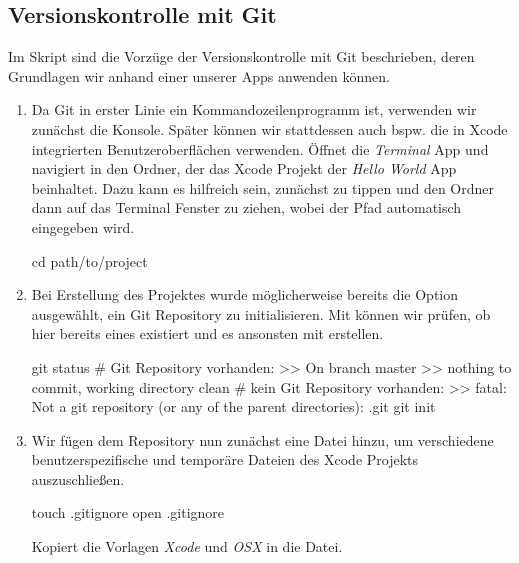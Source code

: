 \documentclass[parskip=half, final]{scrreprt}
\begin{document}
\begin{lecture} %


\chapter{Versionskontrolle mit Git}

Im Skript sind die Vorzüge der Versionskontrolle mit Git beschrieben, deren Grundlagen wir anhand einer unserer Apps anwenden können.


\begin{enumerate}

\item Da Git in erster Linie ein Kommandozeilenprogramm ist, verwenden wir zunächst die Konsole. Später können wir stattdessen auch bspw. die in Xcode integrierten Benutzeroberflächen verwenden. Öffnet die \emph{Terminal} App und navigiert in den Ordner, der das Xcode Projekt der \emph{Hello World} App beinhaltet. Dazu kann es hilfreich sein, zunächst  zu tippen und den Ordner dann auf das Terminal Fenster zu ziehen, wobei der Pfad automatisch eingegeben wird.

\begin{shlst}
cd path/to/project
\end{shlst}

\item Bei Erstellung des Projektes wurde möglicherweise bereits die Option ausgewählt, ein Git Repository zu initialisieren. Mit  können wir prüfen, ob hier bereits eines existiert und es ansonsten mit  erstellen.

\begin{shlst}
git status
# Git Repository vorhanden:
>> On branch master
>> nothing to commit, working directory clean
# kein Git Repository vorhanden:
>> fatal: Not a git repository (or any of the parent directories): .git
git init
\end{shlst}

\item Wir fügen dem Repository nun zunächst eine  Datei hinzu, um verschiedene benutzerspezifische und temporäre Dateien des Xcode Projekts auszuschließen.

\begin{shlst}
touch .gitignore
open .gitignore
\end{shlst}

Kopiert die Vorlagen \emph{Xcode}  und \emph{OSX}  in die  Datei.


\end{enumerate}
\end{lecture}
\end{document}
